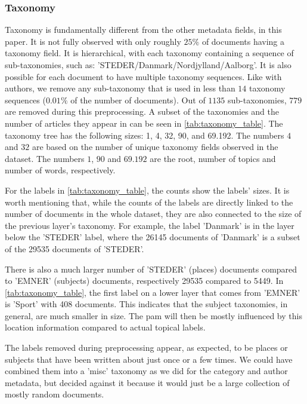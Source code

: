 \subsubsection{Taxonomy}\label{subsec:appendix_taxonomy}
Taxonomy is fundamentally different from the other metadata fields, in this paper.
It is not fully observed with only roughly $25\%$ of documents having a taxonomy field.
It is hierarchical, with each taxonomy containing a sequence of sub-taxonomies, such as: 'STEDER/Danmark/Nordjylland/Aalborg'.
It is also possible for each document to have multiple taxonomy sequences.
Like with authors, we remove any sub-taxonomy that is used in less than $14$ taxonomy sequences ($0.01\%$ of the number of documents).
Out of $1135$ sub-taxonomies, $779$ are removed during this preprocessing.
A subset of the taxonomies and the number of articles they appear in can be seen in \autoref{tab:taxonomy_table}.
The taxonomy tree has the following sizes: 1, 4, 32, 90, and 69.192.
The numbers $4$ and $32$ are based on the number of unique taxonomy fields observed in the dataset.
The numbers $1$, $90$ and $69.192$ are the root, number of topics and number of words, respectively.

For the labels in \autoref{tab:taxonomy_table}, the counts show the labels' sizes.
It is worth mentioning that, while the counts of the labels are directly linked to the number of documents in the whole dataset, they are also connected to the size of the previous layer's taxonomy.
For example, the label 'Danmark' is in the layer below the 'STEDER' label, where the 26145 documents of 'Danmark' is a subset of the 29535 documents of 'STEDER'.

There is also a much larger number of 'STEDER' (places) documents compared to 'EMNER' (subjects) documents, respectively 29535 compared to 5449.
In \autoref{tab:taxonomy_table}, the first label on a lower layer that comes from 'EMNER' is 'Sport' with 408 documents.
This indicates that the subject taxonomies, in general, are much smaller in size.
The \gls{pam} will then be mostly influenced by this location information compared to actual topical labels.

The labels removed during preprocessing appear, as expected, to be places or subjects that have been written about just once or a few times.
We could have combined them into a 'misc' taxonomy as we did for the category and author metadata, but decided against it because it would just be a large collection of mostly random documents.


